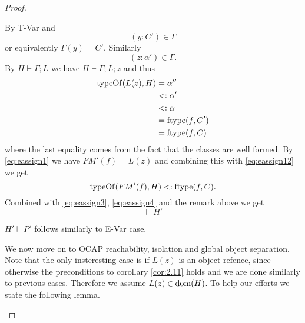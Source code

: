 \begin{proof}
\begin{description}
\begin{description}
\begin{description}
              By {\sc T-Var} and 
              \begin{equation}\label{eq:eassign10}
                (y: C') \in \Gamma 
              \end{equation}
              or equivalently $\Gamma(y) = C'$.
              Similarly
              \begin{equation} \label{eq:eassign11}
                (z: \alpha') \in \Gamma.
              \end{equation}
              By $H \vdash \Gamma; L$ we have $H \vdash \Gamma; L; z$ and thus
              \begin{equation} \label{eq:eassign12}
                \begin{aligned}
                  \mbox{$\mathrm{typeOf}$}(L(z), H) &= \alpha'' \\ 
                                   &<: \alpha' \\ 
                                   &<: \alpha \\ 
                                   &= \mbox{$\mathrm{ftype}$}(f, C') \\ 
                                   &= \mbox{$\mathrm{ftype}$}(f, C)
                \end{aligned}
              \end{equation}
              where the last equality comes from the fact that the classes are
              well formed. By \eqref{eq:eassign1} we have $FM'(f) = L(z)$ and
              combining this with \eqref{eq:eassign12} we get
              \begin{equation} \label{eq:eassign13}
                \mbox{$\mathrm{typeOf}$}(FM'(f), H) <: \mbox{$\mathrm{ftype}$}(f, C).
              \end{equation}
              Combined with \eqref{eq:eassign3}, \eqref{eq:eassign4} and the
              remark above we get
              \begin{equation*} 
                \vdash H'
              \end{equation*}

              $H' \vdash P'$ follows similarly to {\sc E-Var} case.

              We now move on to OCAP reachability, isolation and global object
              separation.  Note that the only insteresting case is if $L(z)$ is
              an object refence, since otherwise the preconditions to corollary
              \ref{cor:2.11} holds and we are done similarly to previous cases.
              Therefore we assume $L(z) \in \mbox{$\mathrm{dom}$}(H)$.  To help our efforts we
              state the following lemma.


\end{description}
\end{description}
\end{description}
\end{proof}
